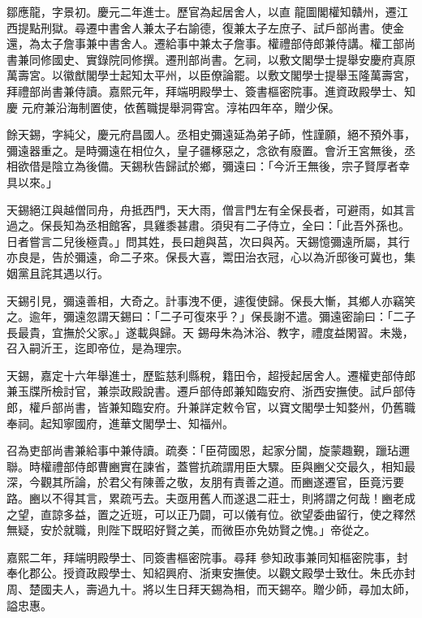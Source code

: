 \begin{pinyinscope}
 鄒應龍，字景初。慶元二年進士。歷官為起居舍人，以直
 龍圖閣權知贛州，遷江西提點刑獄。尋遷中書舍人兼太子右諭德，復兼太子左庶子、試戶部尚書。使金還，為太子詹事兼中書舍人。遷給事中兼太子詹事。權禮部侍郎兼侍講。權工部尚書兼同修國史、實錄院同修撰。遷刑部尚書。乞祠，以敷文閣學士提舉安慶府真原萬壽宮。以徽猷閣學士起知太平州，以臣僚論罷。以敷文閣學士提舉玉隆萬壽宮，拜禮部尚書兼侍讀。嘉熙元年，拜端明殿學士、簽書樞密院事。進資政殿學士、知慶
 元府兼沿海制置使，依舊職提舉洞霄宮。淳祐四年卒，贈少保。



 餘天錫，字純父，慶元府昌國人。丞相史彌遠延為弟子師，性謹願，絕不預外事，彌遠器重之。是時彌遠在相位久，皇子疆椓惡之，念欲有廢置。會沂王宮無後，丞相欲借是陰立為後備。天錫秋告歸試於鄉，彌遠曰：「今沂王無後，宗子賢厚者幸具以來。」



 天錫絕江與越僧同舟，舟抵西門，天大雨，僧言門左有全保長者，可避雨，如其言
 過之。保長知為丞相館客，具雞黍甚肅。須臾有二子侍立，全曰：「此吾外孫也。日者嘗言二兒後極貴。」問其姓，長曰趙與莒，次曰與芮。天錫憶彌遠所屬，其行亦良是，告於彌遠，命二子來。保長大喜，鬻田治衣冠，心以為沂邸後可冀也，集姻黨且詫其遇以行。



 天錫引見，彌遠善相，大奇之。計事洩不便，遽復使歸。保長大慚，其鄉人亦竊笑之。逾年，彌遠忽謂天錫曰：「二子可復來乎？」保長謝不遣。彌遠密諭曰：「二子長最貴，宜撫於父家。」遂載與歸。天
 錫母朱為沐浴、教字，禮度益閑習。未幾，召入嗣沂王，迄即帝位，是為理宗。



 天錫，嘉定十六年舉進士，歷監慈利縣稅，籍田令，超授起居舍人。遷權吏部侍郎兼玉牒所檢討官，兼崇政殿說書。遷戶部侍郎兼知臨安府、浙西安撫使。試戶部侍郎，權戶部尚書，皆兼知臨安府。升兼詳定敕令官，以寶文閣學士知婺州，仍舊職奉祠。起知寧國府，進華文閣學士、知福州。



 召為吏部尚書兼給事中兼侍讀。疏奏：「臣荷國恩，起家分閫，旋蒙趣覲，躐玷邇
 聯。時權禮部侍郎曹豳實在諫省，蓋嘗抗疏謂用臣大驟。臣與豳父交最久，相知最深，今觀其所論，於君父有陳善之敬，友朋有責善之道。而豳遂遷官，臣竟污要路。豳以不得其言，累疏丐去。夫亟用舊人而遂退二莊士，則將謂之何哉！豳老成之望，直諒多益，置之近班，可以正乃闢，可以儀有位。欲望委曲留行，使之釋然無疑，安於就職，則陛下既昭好賢之美，而微臣亦免妨賢之愧。」帝從之。



 嘉熙二年，拜端明殿學士、同簽書樞密院事。尋拜
 參知政事兼同知樞密院事，封奉化郡公。授資政殿學士、知紹興府、浙東安撫使。以觀文殿學士致仕。朱氏亦封周、楚國夫人，壽過九十。將以生日拜天錫為相，而天錫卒。贈少師，尋加太師，謚忠惠。




\end{pinyinscope}
